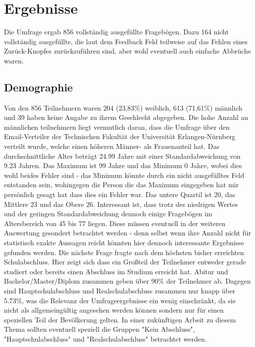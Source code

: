 %
% 

\chapter{Ergebnisse}

Die Umfrage ergab 856 vollständig ausgefüllte Fragebögen. Dazu 164 nicht vollständig ausgefüllte, die laut dem Feedback Feld teilweise auf das Fehlen eines Zurück-Knopfes zurückzuführen sind, aber wohl eventuell auch einfache Abbrüche waren.

\section{Demographie}
Von den 856 Teilnehmern waren 204 (23,83\%) weiblich, 613 (71,61\%) männlich und 39 haben keine Angabe zu ihrem Geschlecht abgegeben. Die hohe Anzahl an männlichen teilnehmern liegt vermutlich daran, dass die Umfrage über den Email-Verteiler der Technischen Fakultät der Universität Erlangen-Nürnberg verteilt wurde, welche einen höheren Männer- als Frauenanteil hat.
Das durchschnittliche Alter beträgt 24.99 Jahre mit einer Standardabweichung von 9.23 Jahren. Das Maximum ist 99 Jahre und das Minimum 0 Jahre, wobei dies wohl beides Fehler sind - das Minimum könnte durch ein nicht ausgefülltes Feld entstanden sein, wohingegen die Person die das Maximum eingegeben hat mir persönlich gesagt hat dass dies ein Fehler war. Das untere Quartil ist 20, das Mittlere 23 und das Obere 26.
Interessant ist, dass trotz des niedrigen Wertes und der geringen Standardabweichung dennoch einige Fragebögen im Altersbereich von 45 bis 77 liegen. Diese müssen eventuell in der weiteren Auswertung gesondert betrachtet werden - denn selbst wenn ihre Anzahl nicht für statistisch exakte Aussagen reicht könnten hier dennoch interessante Ergebnisse gefunden werden.
Die nächste Frage fragte nach dem höchsten bisher erreichten Schulabschluss. Hier zeigt sich dass ein Großteil der Teilnehmer entweder gerade studiert oder bereits einen Abschluss im Studium erreicht hat. Abitur und Bachelor/Master/Diplom zusammen geben über 90\% der Teilnehmer ab. Dagegen sind Hauptschulabschluss und Realschulabschluss zusammen nur knapp über 5.73\%, was die Relevanz der Umfrageergebnisse ein wenig einschränkt, da sie nicht als allgemeingültig angesehen werden können sondern nur für einen speziellen Teil der Bevölkerung gelten. In einer zukünftigen Arbeit zu diesem Thema sollten eventuell speziell die Gruppen "Kein Abschluss", "Hauptschulabschluss" und "Realschulabschluss" betrachtet werden.
